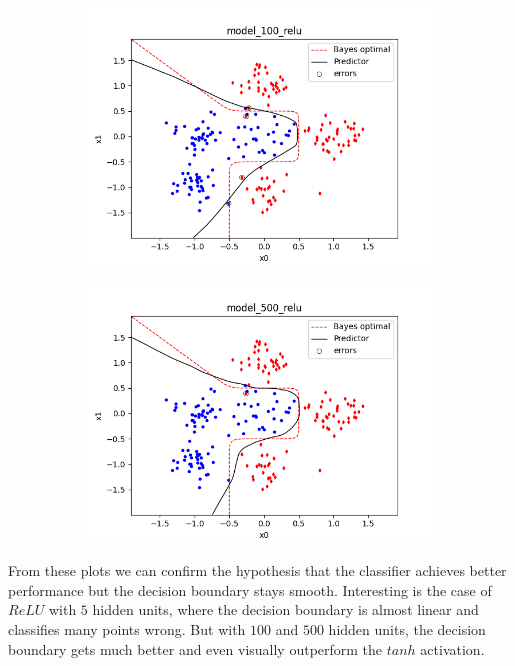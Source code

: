 \documentclass[a4paper,11pt]{article}
\begin{document}
\begin{figure}[ht]
\begin{subfigure}[b]{0.3\textwidth}
        \includegraphics[width=\textwidth]{../boundaries/model_100_relu.png}
    \end{subfigure}
    \hfill
    \begin{subfigure}[b]{0.3\textwidth}
        \includegraphics[width=\textwidth]{../boundaries/model_500_relu.png}
    \end{subfigure}
\end{figure}

From these plots we can confirm the hypothesis that the classifier achieves better performance but the decision boundary stays smooth.
Interesting is the case of $ReLU$ with $5$ hidden units, where the decision boundary is almost linear and classifies many points wrong.
But with $100$ and $500$ hidden units, the decision boundary gets much better and even visually outperform the $tanh$ activation.
\end{document}
